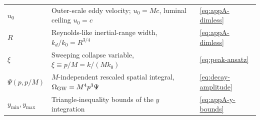 \documentclass[10pt,prd,aps,nobibnotes,superscriptaddress,preprintnumbers,notitlepage]{revtex4-1}
\begin{document}
\begin{tabular}{@{}p{} p{} p{}@{}}
$u_0$                 & Outer-scale eddy velocity; $u_0=Mc$, luminal ceiling $u_0=c$ & \eqref{eq:appA-dimless}\\
$R$                   & Reynolds-like inertial-range width, $k_d/k_0=R^{3/4}$ & \eqref{eq:appA-dimless}\\
$\xi$                 & Sweeping collapse variable, $\xi\equiv p/M=k/(Mk_0)$ & \eqref{eq:peak-ansatz}\\
$\Psi(p,p/M)$         & $M$-independent rescaled spatial integral, $\Omega_{\rm GW}=M^4p^3\Psi$ & \eqref{eq:decay-amplitude}\\
$y_{\min},y_{\max}$   & Triangle-inequality bounds of the $y$ integration & \eqref{eq:appA-y-bounds}\\
\hline\hline
\end{tabular}\par
\end{document}
